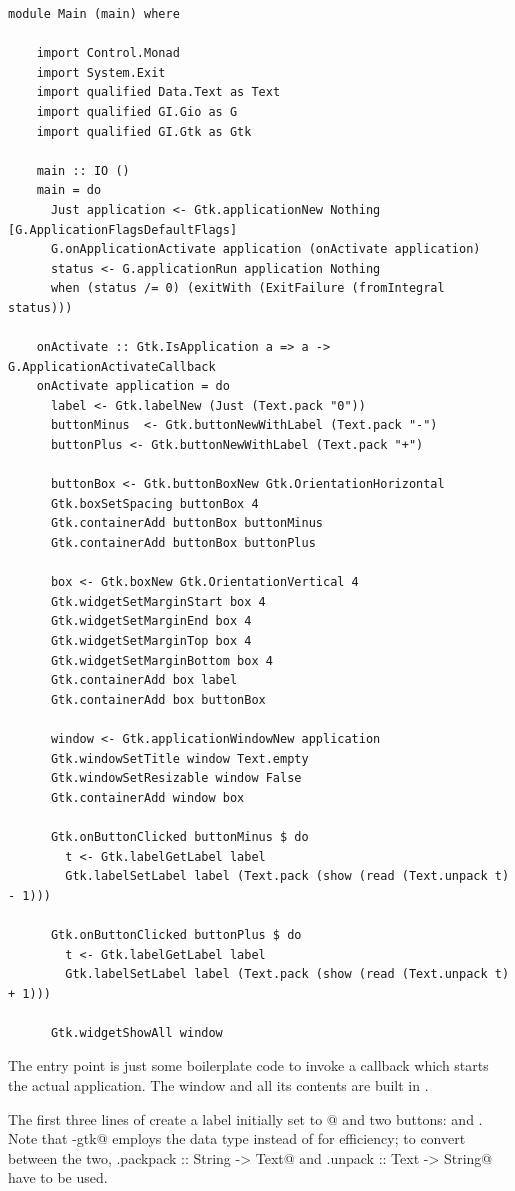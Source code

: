 \documentclass[UdineBachThesis,american,11pt]{PhdThesis}
\begin{document}
  \begin{lstlisting}[gobble=4,basicstyle=\ttfamily\small]
    module Main (main) where

    import Control.Monad
    import System.Exit
    import qualified Data.Text as Text
    import qualified GI.Gio as G
    import qualified GI.Gtk as Gtk

    main :: IO ()
    main = do
      Just application <- Gtk.applicationNew Nothing [G.ApplicationFlagsDefaultFlags]
      G.onApplicationActivate application (onActivate application)
      status <- G.applicationRun application Nothing
      when (status /= 0) (exitWith (ExitFailure (fromIntegral status)))

    onActivate :: Gtk.IsApplication a => a -> G.ApplicationActivateCallback
    onActivate application = do
      label <- Gtk.labelNew (Just (Text.pack "0"))
      buttonMinus  <- Gtk.buttonNewWithLabel (Text.pack "-")
      buttonPlus <- Gtk.buttonNewWithLabel (Text.pack "+")

      buttonBox <- Gtk.buttonBoxNew Gtk.OrientationHorizontal
      Gtk.boxSetSpacing buttonBox 4
      Gtk.containerAdd buttonBox buttonMinus
      Gtk.containerAdd buttonBox buttonPlus

      box <- Gtk.boxNew Gtk.OrientationVertical 4
      Gtk.widgetSetMarginStart box 4
      Gtk.widgetSetMarginEnd box 4
      Gtk.widgetSetMarginTop box 4
      Gtk.widgetSetMarginBottom box 4
      Gtk.containerAdd box label
      Gtk.containerAdd box buttonBox

      window <- Gtk.applicationWindowNew application
      Gtk.windowSetTitle window Text.empty
      Gtk.windowSetResizable window False
      Gtk.containerAdd window box

      Gtk.onButtonClicked buttonMinus $ do
        t <- Gtk.labelGetLabel label
        Gtk.labelSetLabel label (Text.pack (show (read (Text.unpack t) - 1)))

      Gtk.onButtonClicked buttonPlus $ do
        t <- Gtk.labelGetLabel label
        Gtk.labelSetLabel label (Text.pack (show (read (Text.unpack t) + 1)))

      Gtk.widgetShowAll window
  \end{lstlisting}

  The entry point \lstinline@main@ is just some boilerplate code to invoke a
  callback which starts the actual application. The window and all its contents
  are built in \lstinline@onActivate@.

  The first three lines of \lstinline@onActivate@ create a label initially set
  to @ and two buttons: \lstinline@buttonMinus@ and
  \lstinline@buttonPlus@. Note that \lstinline@gi-gtk@ employs the
  \lstinline@Text@ data type instead of \lstinline@String@ for efficiency;
  to convert between the two, \lstinline@Text.packpack :: String -> Text@ and
  \lstinline@Text.unpack :: Text -> String@ have to be used.
\end{document}
